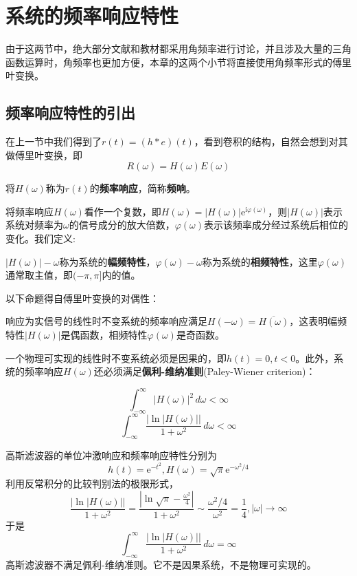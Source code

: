 \documentclass{ctexbook}
\begin{document}
\section{系统的频率响应特性}\label{sec:Freq_Response}

由于这两节中，绝大部分文献和教材都采用角频率进行讨论，并且涉及大量的三角函数运算时，角频率也更加方便，本章的这两个小节将直接使用角频率形式的傅里叶变换。

\subsection{频率响应特性的引出}\label{sub:freq_response}
在上一节中我们得到了$r(t)=(h*e)(t)$，看到卷积的结构，自然会想到对其做傅里叶变换，即\[R(\omega)=H(\omega)E(\omega)\]
\begin{definition}[频率响应]
    将$H(\omega)$称为$r(t)$的\textbf{频率响应}，简称\textbf{频响}。
\end{definition}

将频率响应$H(\omega)$看作一个复数，即$H(\omega)=|H(\omega)|\mathrm{e}^{\mathrm{i}\varphi(\omega)}$，则$|H(\omega)|$表示系统对频率为$\omega$的信号成分的放大倍数，$\varphi(\omega)$表示该频率成分经过系统后相位的变化。我们定义:
\begin{definition}[幅频特性和相频特性]
    $|H(\omega)|-\omega$称为系统的\textbf{幅频特性}，$\varphi(\omega)-\omega$称为系统的\textbf{相频特性}，这里$\varphi(\omega)$通常取主值，即$(-\pi,\pi]$内的值。
\end{definition}

以下命题得自傅里叶变换的对偶性：
\begin{proposition}
    响应为实信号的线性时不变系统的频率响应满足$H(-\omega)=\overline{H(\omega)}$，这表明幅频特性$|H(\omega)|$是偶函数，相频特性$\varphi(\omega)$是奇函数。
\end{proposition}

一个物理可实现的线性时不变系统必须是因果的，即$h(t)=0,t<0$。此外，系统的频率响应$H(\omega)$还必须满足\textbf{佩利-维纳准则}(Paley-Wiener criterion)\cite{signal_systems}：
\begin{definition}[佩利-维纳准则]
    \[\int_{-\infty}^{\infty}\left|H(\omega)\right|^2\,d\omega<\infty\]
    \[\int_{-\infty}^{\infty}\frac{\left|\ln|H(\omega)|\right|}{1+\omega^2}\,d\omega<\infty\]
\end{definition}
\begin{example}
    高斯滤波器的单位冲激响应和频率响应特性分别为
    $$h(t)=\mathrm{e}^{-t^2},H(\omega)=\sqrt{\pi}\mathrm{e}^{-\omega^2/4}$$
    利用反常积分的比较判别法的极限形式，
    \[\frac{|\ln|H(\omega)||}{1+\omega^2}=\frac{\left|\ln \sqrt{\pi}-\frac{\omega^2}{4}\right|}{1+\omega^2}\sim \frac{\omega^2/4}{\omega^2}=\frac{1}{4},|\omega|\to\infty\]
    于是
    \[\int_{-\infty}^{\infty}\frac{\left|\ln|H(\omega)|\right|}{1+\omega^2}\,d\omega=\infty\]
    高斯滤波器不满足佩利-维纳准则。它不是因果系统，不是物理可实现的。
\end{example}
\end{document}
